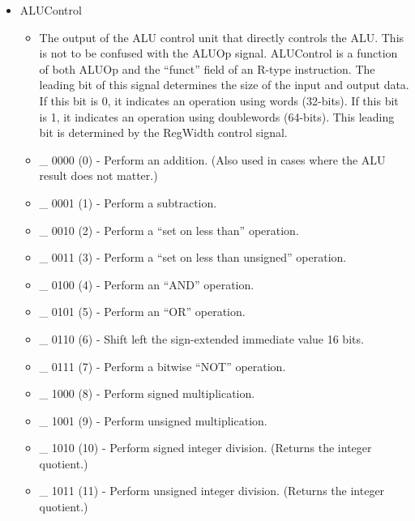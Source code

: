 \documentclass[
    paper=letter,
    parskip=half,
    fontsize=12pt,
    titlepage=firstiscover,
    toc=bibliography,
    numbers=endperiod
]{scrartcl}
\providecommand{\tightlist}{%
  \setlength{\itemsep}{0pt}\setlength{\parskip}{0pt}}
\begin{document}
\begin{itemize}
    \item ALUControl
          \begin{itemize}
              \tightlist
              \item The output of the ALU control unit that directly controls the ALU. This
                    is not to be confused with the ALUOp signal. ALUControl is a function of
                    both ALUOp and the ``funct'' field of an R-type instruction. The leading
                    bit of this signal determines the size of the input and output data. If
                    this bit is 0, it indicates an operation using words (32-bits). If this
                    bit is 1, it indicates an operation using doublewords (64-bits). This
                    leading bit is determined by the RegWidth control signal.
              \item \_ 0000 (0) - Perform an addition. (Also used in cases where the ALU result does not matter.)
              \item \_ 0001 (1) - Perform a subtraction.
              \item \_ 0010 (2) - Perform a ``set on less than'' operation.
              \item \_ 0011 (3) - Perform a ``set on less than unsigned'' operation.
              \item \_ 0100 (4) - Perform an ``AND'' operation.
              \item \_ 0101 (5) - Perform an ``OR'' operation.
              \item \_ 0110 (6) - Shift left the sign-extended immediate value 16 bits.
              \item \_ 0111 (7) - Perform a bitwise ``NOT'' operation.
              \item \_ 1000 (8) - Perform signed multiplication.
              \item \_ 1001 (9) - Perform unsigned multiplication.
              \item \_ 1010 (10) - Perform signed integer division. (Returns the integer quotient.)
              \item \_ 1011 (11) - Perform unsigned integer division. (Returns the integer quotient.)
          \end{itemize}


\end{itemize}
\end{document}
